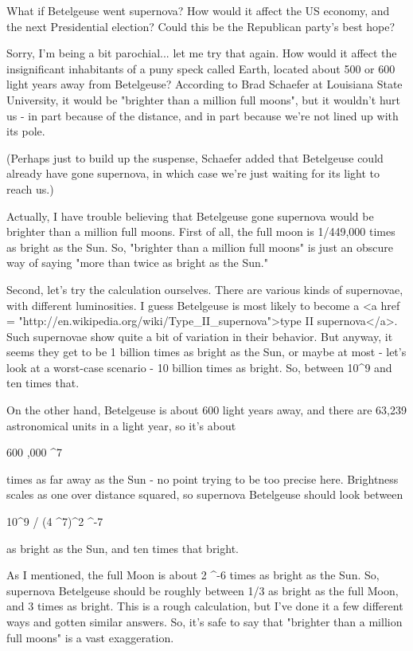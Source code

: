 What if Betelgeuse went supernova?  How would it affect the US
economy, and the next Presidential election?  Could this be the
Republican party's best hope?

Sorry, I'm being a bit parochial... let me try that again.  How would
it affect the insignificant inhabitants of a puny speck called Earth,
located about 500 or 600 light years away from Betelgeuse?  According
to Brad Schaefer at Louisiana State University, it would be "brighter
than a million full moons", but it wouldn't hurt us - in part because of
the distance, and in part because we're not lined up with its pole.

(Perhaps just to build up the suspense, Schaefer added that Betelgeuse
could already have gone supernova, in which case we're just waiting
for its light to reach us.)

Actually, I have trouble believing that Betelgeuse gone supernova
would be brighter than a million full moons.  First of all,
the full moon is 1/449,000 times as bright as the Sun.  So, 
"brighter than a million full moons" is just an obscure
way of saying "more than twice as bright as the Sun."

Second, let's try the calculation ourselves.  There are various
kinds of supernovae, with different luminosities.   I guess 
Betelgeuse is most likely to become a 
<a href = "http://en.wikipedia.org/wiki/Type_II_supernova">type II 
supernova</a>.   Such supernovae show quite a bit of variation
in their behavior.  But anyway, it seems they get to be
1 billion times as bright as the Sun, or maybe at most - let's look at a
worst-case scenario - 10 billion times as bright.  
So, between 10^{9} and ten times that.

On the other hand, Betelgeuse is about 600 light years away, 
and there are 63,239 astronomical units in a light year,
so it's about

600 ,000  ^{7}

times as far away as the Sun - no point trying to be too precise
here.   Brightness scales as one over distance squared, so 
supernova Betelgeuse should look between

10^{9} / (4 ^{7})^{2}  ^{-7}

as bright as the Sun, and ten times that bright.  

As I mentioned, the full Moon is about 2 ^{-6}
times as bright as the Sun.  So, supernova Betelgeuse should be
roughly between 1/3 as bright as the full Moon, and 3 times as bright.
This is a rough calculation, but I've done it a few different ways
and gotten similar answers.  So, it's safe to say that 
"brighter than a million full moons" is a vast
exaggeration.

